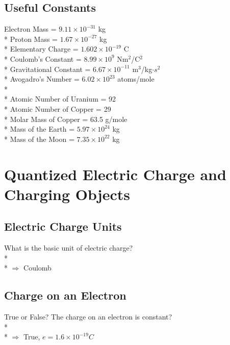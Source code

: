 \documentclass[11pt]{article}
\begin{document}
\maketitle
\tableofcontents
\vspace{50pt}

\subsection*{Useful Constants}
Electron Mass = $9.11 \times 10^{-31}$ kg \\*
Proton Mass = $1.67 \times 10^{-27}$ kg \\*
Elementary Charge = $1.602 \times 10^{-19}$ C \\*
Coulomb's Constant = $8.99 \times 10^9$ Nm$^2$/C$^2$ \\*
Gravitational Constant = $6.67 \times 10^{-11}$ m$^3$/kg$\cdot s^2$ \\*
Avogadro's Number = $ 6.02 \times 10^{23}$ atoms/mole \\*\\*
Atomic Number of Uranium = 92 \\*
Atomic Number of Copper = 29 \\*
Molar Mass of Copper = 63.5 g/mole \\*
Mass of the Earth = $5.97 \times 10^{24}$ kg\\*
Mass of the Moon = $7.35 \times 10^{22}$ kg


\pagebreak
\section{Quantized Electric Charge and Charging Objects}
\vspace{10pt}

\subsection{Electric Charge Units}
What is the basic unit of electric charge?\\* \\*
$\Rightarrow$ Coulomb

\subsection{Charge on an Electron}
True or False?  The charge on an electron is constant? \\* \\*
$\Rightarrow$ True, $e = 1.6 \times 10^{-19} C$ 
\end{document}

